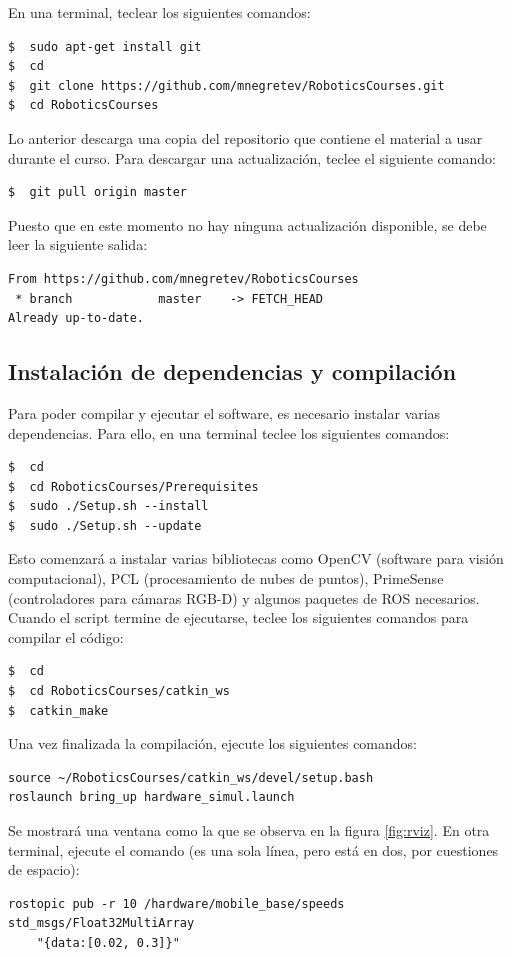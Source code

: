 \documentclass[letterpaper,12pt]{article}
\begin{document}
En una terminal, teclear los siguientes comandos:
\begin{verbatim}
$  sudo apt-get install git
$  cd
$  git clone https://github.com/mnegretev/RoboticsCourses.git
$  cd RoboticsCourses
\end{verbatim}
Lo anterior descarga una copia del repositorio que contiene el material a usar durante el curso. Para descargar una actualización, teclee el siguiente comando:
\begin{verbatim}
$  git pull origin master
\end{verbatim}
Puesto que en este momento no hay ninguna actualización disponible, se debe leer la siguiente salida:
\begin{verbatim}
From https://github.com/mnegretev/RoboticsCourses
 * branch            master    -> FETCH_HEAD
Already up-to-date.
\end{verbatim}

\subsection{Instalación de dependencias y compilación}
Para poder compilar y ejecutar el software, es necesario instalar varias dependencias. Para ello, en una terminal teclee los siguientes comandos:
\begin{verbatim}
$  cd
$  cd RoboticsCourses/Prerequisites
$  sudo ./Setup.sh --install
$  sudo ./Setup.sh --update
\end{verbatim}

Esto comenzará a instalar varias bibliotecas como OpenCV (software para visión computacional), PCL (procesamiento de nubes de puntos), PrimeSense (controladores para cámaras RGB-D) y algunos paquetes de ROS necesarios. Cuando el script termine de ejecutarse, teclee los siguientes comandos para compilar el código:
\begin{verbatim}
$  cd
$  cd RoboticsCourses/catkin_ws
$  catkin_make
\end{verbatim}

Una vez finalizada la compilación, ejecute los siguientes comandos:

\begin{verbatim}
source ~/RoboticsCourses/catkin_ws/devel/setup.bash
roslaunch bring_up hardware_simul.launch
\end{verbatim}

Se mostrará una ventana como la que se observa en la figura \ref{fig:rviz}. En otra terminal, ejecute el comando (es una sola línea, pero está en dos, por cuestiones de espacio):
\begin{verbatim}
rostopic pub -r 10 /hardware/mobile_base/speeds std_msgs/Float32MultiArray 
    "{data:[0.02, 0.3]}"
\end{verbatim}
\end{document}
